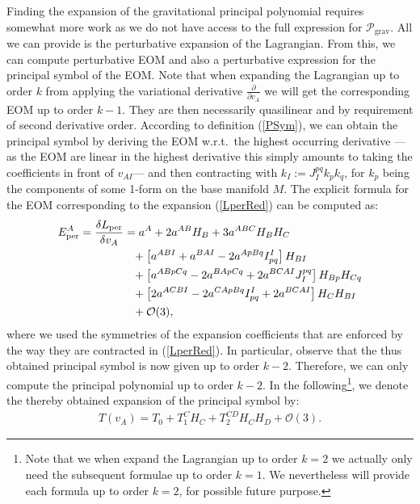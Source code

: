 Finding the expansion of the gravitational principal polynomial requires somewhat more work as we do not have access to the full expression for $\mathcal{P}_{\text{grav}}$. All we can provide is the perturbative expansion of the Lagrangian. From this, we can compute perturbative EOM and also a perturbative expression for the principal symbol of the EOM.
Note that when expanding the Lagrangian up to order $k$ from applying the variational derivative $\frac{\partial}{\partial v_A}$ we will get the corresponding EOM up to order $k-1$. They are then necessarily quasilinear and by requirement of second derivative order. According to definition (\ref{PSym}), we can obtain the principal symbol by deriving the EOM w.r.t.\ the highest occurring derivative  ---as the EOM are linear in the highest derivative this simply amounts to taking the coefficients in front of $v_{AI}$--- and then contracting with $k_I :=J_I^{pq} k_pk_q$, for $k_p$ being the components of some 1-form on the base manifold $M$. 
The explicit formula for the EOM corresponding to the expansion (\ref{LperRed}) can be computed as:
\begin{align}\label{EOMPert}
    \begin{aligned}
    E_{\text{per}}^A = \frac{\delta L_{\text{per}}}{\delta v_A} &= a^A + 2 a^{AB}H_B + 3a^{ABC}H_B H_C \\
    &\hphantom{=}+ \left [a^{ABI} + a^{BAI} - 2 a^{ApBq}I_{pq}^I  \right ] H_{BI} \\
    &\hphantom{=}+ \left[a^{ABpCq} -2a^{BApCq} +2a^{BCAI} J_I^{pq} \right]H_{Bp}H_{Cq} \\
    &\hphantom{=}+ \left [2a^{ACBI} -2a^{CApBq}I_{pq}^I + 2a^{BCAI} \right ]H_C H_{BI} \\
    &\hphantom{=}+ \mathcal{O}(3),
    \end{aligned}
\end{align}
where we used the symmetries of the expansion coefficients that are enforced by the way they are contracted in (\ref{LperRed}).
In particular, observe that the thus obtained principal symbol is now given up to order $k-2$. Therefore, we can only compute the principal polynomial up to order $k-2$. In the following\footnote{Note that we when expand the Lagrangian up to order $k=2$ we actually only need the subsequent formulae up to order $k=1$. We nevertheless will provide each formula up to order $k=2$, for possible future purpose.}, we denote the thereby obtained expansion of the principal symbol by: 
\begin{align}
    T(v_A) = T_0 + T_1^CH_C + T_2^{CD}H_CH_D + \mathcal{O}(3).
\end{align}

